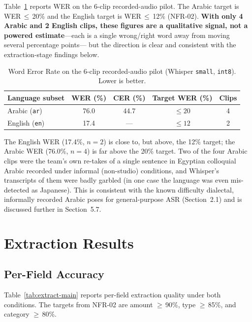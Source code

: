 Table~\ref{tab:wer} reports WER on the 6-clip recorded-audio pilot. The Arabic
target is WER\,$\leq$\,20\% and the English target is WER\,$\leq$\,12\%
(NFR-02). \textbf{With only 4 Arabic and 2 English clips, these figures are a
qualitative signal, not a powered estimate}---each is a single wrong/right word
away from moving several percentage points--- but the direction is clear and
consistent with the extraction-stage findings below.

\begin{table}[H]
\centering
\caption{Word Error Rate on the 6-clip recorded-audio pilot (Whisper \texttt{small}, \texttt{int8}). Lower is better.}
\label{tab:wer}
\small
\renewcommand{\arraystretch}{1.3}
\begin{tabularx}{\textwidth}{X c c c c}
\toprule
\textbf{Language subset} & \textbf{WER (\%)} & \textbf{CER (\%)} & \textbf{Target WER (\%)} & \textbf{Clips} \\
\midrule
Arabic (\texttt{ar})  & 76.0 & 44.7 & $\leq 20$ & 4 \\
English (\texttt{en}) & 17.4 & ---  & $\leq 12$ & 2 \\
\bottomrule
\end{tabularx}
\end{table}

The English WER (17.4\%, $n=2$) is close to, but above, the 12\% target; the
Arabic WER (76.0\%, $n=4$) is far above the 20\% target. Two of the four Arabic
clips were the team's own re-takes of a single sentence in Egyptian colloquial
Arabic recorded under informal (non-studio) conditions, and Whisper's transcripts
of them were badly garbled (in one case the language was even mis-detected as
Japanese). This is consistent with the known difficulty dialectal, informally
recorded Arabic poses for general-purpose ASR (Section~2.1) and is discussed
further in Section~5.7.

\section{Extraction Results}

\subsection{Per-Field Accuracy}

Table~\ref{tab:extract-main} reports per-field extraction quality under both
conditions. The targets from NFR-02 are amount $\geq$\,90\%, type $\geq$\,85\%,
and category $\geq$\,80\%.

